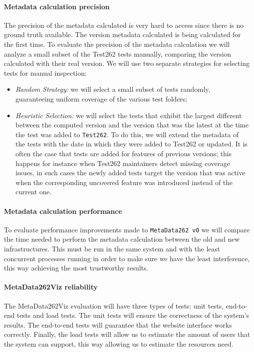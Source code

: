 \documentclass[runningheads]{llncs}
\begin{document}
\paragraph{Metadata calculation precision}
The precision of the metadata calculated is very hard to access since there is no ground truth available. The version metadata calculated is being calculated for the first time. To evaluate the precision of the metadata calculation we will analyze a small subset of the Test262 tests manually, comparing the version calculated with their real version. We will use two separate strategies for selecting tests for manual inspection: 
\begin{itemize}
\item \emph{Random Strategy:} we will select a small subset of tests randomly, guaranteeing uniform coverage of the various test folders; 
%
\item \emph{Heuristic Selection:} we will select the tests that exhibit the largest different between the computed version and the version that was the latest at the time the test was added to \texttt{Test262}. To do this, we will extend the metadata of the tests with the date in which they were added to Test262 or updated. It is often the case that tests are added for features of previous versions; this happens for instance when Test262 maintainers detect missing coverage issues, in such cases the newly added tests target the version that was active when the corresponding uncovered feature was introduced instead of the current one.
\end{itemize}


\paragraph{Metadata calculation performance}
To evaluate performance improvements made to \texttt{MetaData262 v0} we will compare the time needed to perform the metadata calculation between the old and new infrastructures. This must be run in the same system and with the least concurrent processes running in order to make sure we have the least interference, this way achieving the most trustworthy results.



\paragraph{MetaData262Viz reliability}
The MetaData262Viz evaluation will have three types of tests: unit tests, end-to-end tests and load tests. The unit tests will ensure the correctness of the system's results. The end-to-end tests will guarantee that the website interface works correctly. Finally, the load tests will allow us to estimate the amount of users that the system can support, this way allowing us to estimate the resources need.
\end{document}
